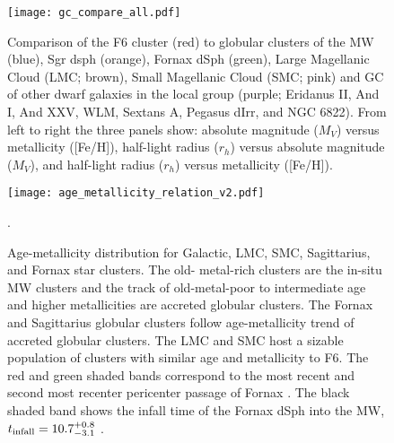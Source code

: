 \documentclass[twocolumn]{aastex63}
\begin{document}
\begin{figure*}
\texttt{[image: gc\_compare\_all.pdf]}
\caption{Comparison of the F6 cluster (red) to globular clusters of the MW (blue), Sgr dsph (orange), Fornax dSph (green), {Large Magellanic Cloud (LMC; brown), Small Magellanic Cloud (SMC; pink)} and GC of other dwarf galaxies in the local group (purple; Eridanus II, And I, And XXV, WLM, Sextans A, Pegasus dIrr, and NGC 6822).
From left to right the three panels show: absolute magnitude ($M_V$) versus metallicity ([Fe/H]), half-light radius  ($r_{h}$) versus absolute magnitude ($M_V$), and half-light radius  ($r_{h}$)  versus metallicity ([Fe/H]).
}
\label{fig:gc_compare}
\end{figure*}

\begin{figure}
\texttt{[image: age\_metallicity\_relation\_v2.pdf]}
\caption{Age-metallicity distribution for Galactic, {LMC, SMC,} Sagittarius, and Fornax star clusters.  
The old- metal-rich clusters are the in-situ MW clusters and the track of old-metal-poor to intermediate age and higher metallicities are accreted globular clusters.  The Fornax and Sagittarius globular clusters follow age-metallicity trend of  accreted globular clusters.
{The LMC and SMC host a sizable population of clusters with similar age and metallicity to F6.}
The red and green shaded bands correspond to the most recent and second most recenter pericenter passage of Fornax \citep{Rusakov2021MNRAS.502..642R}.
The black shaded band shows the infall time of the Fornax dSph into the MW,  $t_{\rm infall} = 10.7_{-3.1}^{+0.8}$ \citep{Fillingham2019arXiv190604180F}.
}
\label{fig:age_feh}.
\end{figure}
\end{document}
